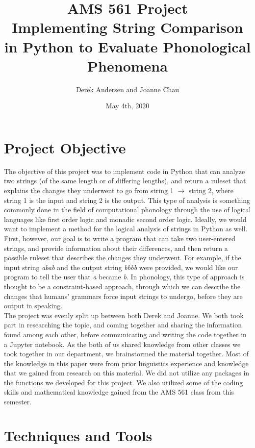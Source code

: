 \documentclass{article}
\title{\textbf{AMS 561 Project}\\Implementing String Comparison in Python to Evaluate Phonological Phenomena}
\author{Derek Andersen and Joanne Chau}
\date{May 4th, 2020}
\begin{document}
\maketitle

\section*{Project Objective}

The objective of this project was to implement code in Python that can analyze two strings (of the same length or of differing lengths), and return a ruleset that explains the changes they underwent to go from string 1 $\rightarrow$ string 2, where string 1 is the input  and string 2 is the output. This type of analysis is something commonly done in the field of computational phonology through the use of logical languages like first order logic and monadic second order logic. Ideally, we would want to implement a method for the logical analysis of strings in Python as well.\\ 

First, however, our goal is to write a program that can take two user-entered strings, and provide information about their differences, and then return a possible ruleset that describes the changes they underwent. For example, if the input string \textit{abab} and the output string \textit{bbbb} were provided, we would like our program to tell the user that \textit{a} became \textit{b}. In phonology, this type of approach is thought to be a constraint-based approach, through which we can describe the changes that humans' grammars force input strings to undergo, before they are output in speaking. \\

The project was evenly split up between both Derek and Joanne. We both took part in researching the topic, and coming together and sharing the information found among each other, before communicating and writing the code together in a Jupyter notebook. As the both of us shared knowledge from other classes we took together in our department, we brainstormed the material together. Most of the knowledge in this paper were from prior linguistics experience and knowledge that we gained from research on this material. We did not utilize any packages in the functions we developed for this project. We also utilized some of the coding skills and mathematical knowledge gained from the AMS 561 class from this semester.
 
\section*{Techniques and Tools}
\end{document}
